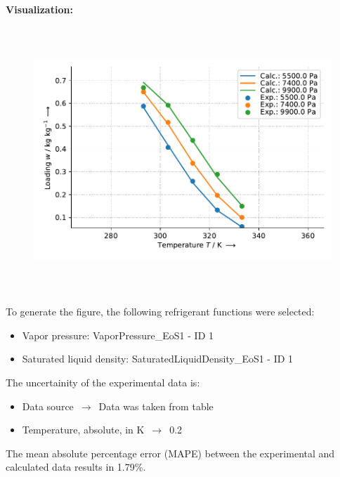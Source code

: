 \textbf{Visualization:}
%
\begin{figure}[!htp]
{\noindent\includegraphics[height=10cm, keepaspectratio]{figs/ads/ads_Methanol_activated_carbon_HC-20C_DubininAstakhov_1.pdf}}
\end{figure}
%

To generate the figure, the following refrigerant functions were selected:
\begin{itemize}
\item Vapor pressure: VaporPressure\_EoS1 - ID 1
\item Saturated liquid density: SaturatedLiquidDensity\_EoS1 - ID 1
\end{itemize}

The uncertainity of the experimental data is:
\begin{itemize}
\item Data source $\,\to\,$ Data was taken from table
\item Temperature, absolute, in $\si{\kelvin}$ $\,\to\,$ 0.2
\end{itemize}

The mean absolute percentage error (MAPE) between the experimental and calculated data results in 1.79\%.
\FloatBarrier
\newpage
